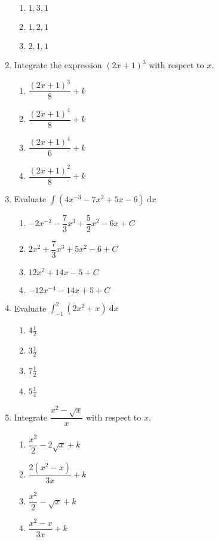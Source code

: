 \begin{multicols}{2}
\begin{enumerate}[label={\arabic*.}]
\begin{enumerate}[label={\Alph*.}]
        \item \(1, 3, 1\)
        \item \(1, 2, 1\)
        \item \(2, 1, 1\)
      \end{enumerate}
    \item Integrate the expression \({(2x+1)}^{3}\) with respect to \(x\).
      \begin{enumerate}[label={\Alph*.}]
        \item \(\dfrac{{(2x+1)}^{3}}{8} + k\)
        \item \(\dfrac{{(2x+1)}^{4}}{8} + k\)
        \item \(\dfrac{{(2x+1)}^{4}}{6} + k\)
        \item \(\dfrac{{(2x+1)}^{2}}{8} + k\)
      \end{enumerate}
    \item Evaluate \(\displaystyle \int (4{x}^{-3} - 7{x}^{2} + 5x - 6)\ \mathrm{d}x\)
      \begin{enumerate}[label={\Alph*.}]
        \item \(-2x^{-2}-\dfrac{7}{3}x^{3}+\dfrac{5}{2}x^2-6x + C\)
        \item \(2x^{2}+\dfrac{7}{3}x^{3}+5x^{2}-6 + C\)
        \item \(12x^{2}+14x-5 + C\)
        \item \(-12x^{-4}-14x+5 + C\)
      \end{enumerate}
    \item Evaluate \(\displaystyle \int_{-1}^{2}\left(2x^{2} + x\right)\ \mathrm{d}x\)
      \begin{enumerate}[label={\Alph*.}]
        \item \(4\frac{1}{2}\)
        \item \(3\frac{1}{2}\)
        \item \(7\frac{1}{2}\)
        \item \(5\frac{1}{4}\)
      \end{enumerate}
    \item Integrate \(\dfrac{x^{2}-\sqrt{x}}{x}\) with respect to \(x\).
      \begin{enumerate}[label={\Alph*.}]
        \item \(\dfrac{x^{2}}{2} - 2\sqrt{x} + k\)
        \item \(\dfrac{2(x^{2}-x)}{3x} + k\)
        \item \(\dfrac{x^{2}}{2} - \sqrt{x} + k\)
        \item \(\dfrac{x^{2}-x}{3x} + k\)
      \end{enumerate}

\end{enumerate}
\end{multicols}
